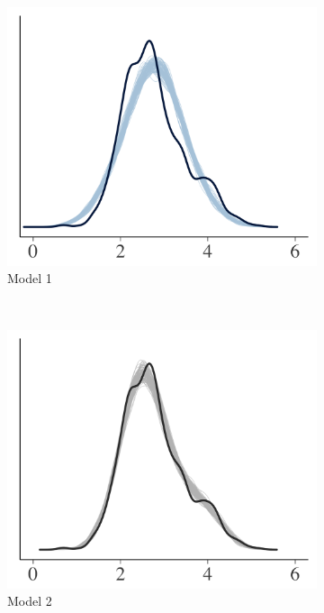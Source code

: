 \documentclass{statsoc}
\begin{document}
\begin{figure}
\centering
\begin{subfigure}{0.31\textwidth}
\includegraphics[width=\textwidth]{ppc_dens1.png}
\caption{Model 1}
\label{fig:ppc_dens0}
\end{subfigure}
~
\begin{subfigure}{0.31\textwidth}
\includegraphics[width=\textwidth]{ppc_dens2.png}
\caption{Model 2}
\label{fig:ppc_dens2}
\end{subfigure}
~
\begin{subfigure}{0.31\textwidth}

\end{subfigure}
\end{figure}
\end{document}
